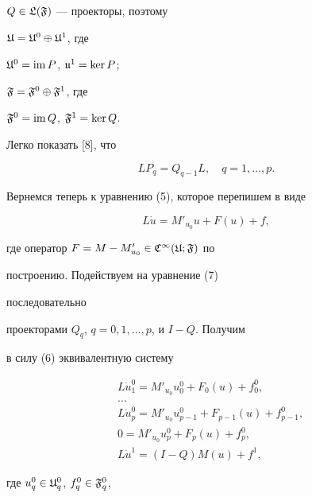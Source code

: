 $Q\in\frak L(\frak F)$ --- проекторы, поэтому


$\frak U=\frak U^0\oplus\frak U^1$, где


$\frak U^0=\operatorname{im} P$, $\frak u^1=\ker P$;


$\frak F=\frak F^0\oplus\frak F^1$, где


$\frak F^0=\operatorname{im} Q$, $\frak F^1=\ker Q$.


Легко показать [8], что


\begin{equation}


LP_q=Q_{q-1}L,\quad q=1,\dotsc,p.


\end{equation}





Вернемся теперь к уравнению (5), которое перепишем в виде


\begin{equation}


L\Dot u=M'_{u_0}u+F(u)+f,


\end{equation}


где оператор $F=M-M'_{u_0}\in\frak C^\infty(\frak U;\frak F)$ по


построению. Подействуем на уравнение (7)


последовательно


проекторами $Q_q$, $q=0,1,\dotsc,p$, и $I-Q$. Получим


в силу (6) эквивалентную систему


\begin{equation}


\begin{split}


& L\Dot u^0_1=M'_{u_0}u^0_0+F_0(u)+f^0_0,\\


&\dotsc \\


& L\Dot u^0_p=M'_{u_0}u^0_{p-1}+F_{p-1}(u)+f^0_{p-1},\\


&0=M'_{u_0}u^0_p+F_p(u)+f^0_p,\\


&L\Dot u^1=(I-Q)M(u)+f^1,


\end{split}


\end{equation}


где $u^0_q\in\frak U^0_q$, $f^0_q\in\frak F^0_q$,


